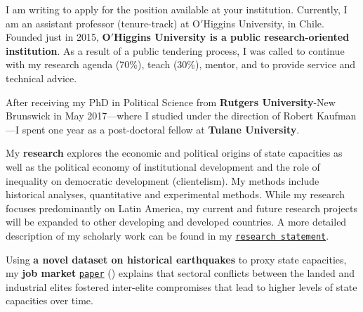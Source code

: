 \vspace{-0.3cm}I am writing to apply for the position available at your institution. Currently, I am an assistant professor (tenure-track) at O$'$Higgins University, in Chile. Founded just in 2015, {\bf O$'$Higgins University is a public research-oriented institution}. As a result of a public tendering process, I was called to continue with my research agenda (70\%), teach (30\%), mentor, and to provide service and technical advice.

After receiving my PhD in Political Science from {\bf Rutgers University}-New Brunswick in May 2017---where I studied under the direction of Robert Kaufman---I spent one year as a post-doctoral fellow at {\bf Tulane University}. 


My {\bf research} explores the economic and political origins of state capacities as well as the political economy of institutional development and the role of inequality on democratic development (clientelism). My methods include historical analyses, quantitative and experimental methods. While my research focuses predominantly on Latin America, my current and future research projects will be expanded to other developing and developed countries. A more detailed description of my scholarly work can be found in my \href{http://github.com/hbahamonde/Job_Market/raw/master/Bahamonde_Research_Statement.pdf}{\texttt{research statement}}.


Using {\bf a novel dataset on historical earthquakes} to proxy state capacities, my {\bf job market} \href{https://github.com/hbahamonde/Earthquake_Paper/raw/master/Bahamonde_Earthquake_Paper.pdf}{\texttt{paper}} (\emph{\unskip}) explains that sectoral conflicts between the landed and industrial elites fostered inter-elite compromises that lead to higher levels of state capacities over time. 

